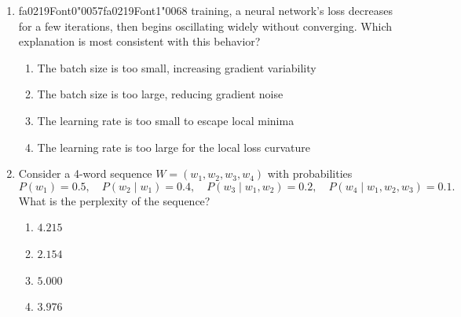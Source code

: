 \documentclass[12pt]{article}
\begin{document}
\begin{enumerate}[label=Q\arabic*.]
 \begin{enumerate}[label=(\Alph*)]
     \item Lower perplexity always indicates overfitting to training data
     \item Perplexity ignores normalization across token positions
     \item Question answering requires larger vocabularies than modeling
     \item Perplexity reflects intrinsic likelihood rather than task utility
 \end{enumerate}
 
 \item {\csname fa0219Font0\endcsname\char"0057}{\csname fa0219Font1\endcsname\char"0068} training, a neural network's loss decreases for a few iterations, then begins oscillating widely without converging. Which explanation is most consistent with this behavior?
 \begin{enumerate}[label=(\Alph*)]
     \item The batch size is too small, increasing gradient variability
     \item The batch size is too large, reducing gradient noise
     \item The learning rate is too small to escape local minima
     \item The learning rate is too large for the local loss curvature
 \end{enumerate}
 
 \item Consider a 4-word sequence $W = (w_1, w_2, w_3, w_4)$ with probabilities
 \[
 P(w_1) = 0.5,\quad
 P(w_2 \mid w_1) = 0.4,\quad
 P(w_3 \mid w_1, w_2) = 0.2,\quad
 P(w_4 \mid w_1, w_2, w_3) = 0.1.
 \]
 What is the perplexity of the sequence?
 \begin{enumerate}[label=(\Alph*)]
     \item $4.215$
     \item $2.154$
     \item $5.000$
     \item $3.976$
 \end{enumerate}
 

\end{enumerate}
\end{document}
